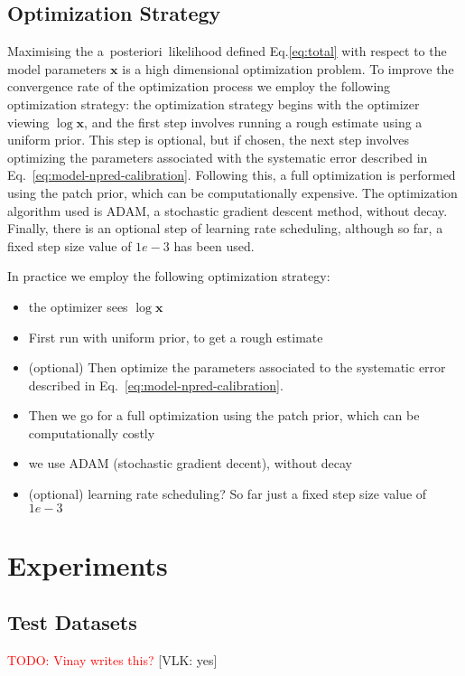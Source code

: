 \documentclass[twocolumn]{aastex631}
\newcommand{\aposteriori}{a~posteriori~}
\newcommand{\todo}[1]{\textcolor{red}{TODO: #1}\PackageWarning{TODO:}{#1!}}
\newcommand{\vlk}[1]{{\color{blue} [VLK: #1]}}
\begin{document}
    \subsection{Optimization Strategy}
    Maximising the \aposteriori likelihood defined Eq.\ref{eq:total} with respect to the model parameters $\mathbf{x}$ is a high dimensional optimization problem. To improve the convergence rate of the optimization process we employ the following optimization strategy: the optimization strategy begins with the optimizer viewing $\log{\mathbf{x}}$, and the first step involves running a rough estimate using a uniform prior. This step is optional, but if chosen, the next step involves optimizing the parameters associated with the systematic error described in Eq.~\ref{eq:model-npred-calibration}. Following this, a full optimization is performed using the patch prior, which can be computationally expensive. The optimization algorithm used is ADAM, a stochastic gradient descent method, without decay. Finally, there is an optional step of learning rate scheduling, although so far, a fixed step size value of $1e-3$ has been used.
    
    In practice we employ the following optimization strategy:
    \begin{itemize}
        \item the optimizer sees $\log{\mathbf{x}}$
        \item First run with uniform prior, to get a rough estimate
        \item (optional) Then optimize the parameters associated to the systematic error described in Eq.~\ref{eq:model-npred-calibration}.
        \item Then we go for a full optimization using the patch prior, which can be computationally costly
        \item we use ADAM (stochastic gradient decent), without decay
        \item  (optional) learning rate scheduling? So far just a fixed step size value of $1e-3$
    \end{itemize}
    
    
        
    \section{Experiments}
    \subsection{Test Datasets}\label{sec:testmodels}
    \todo{Vinay writes this?}
    \vlk{yes}
\end{document}
